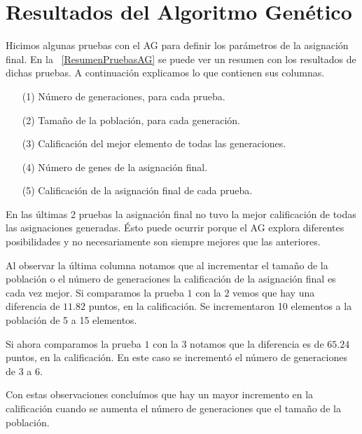 \section{Resultados del Algoritmo Genético}

Hicimos algunas pruebas con el AG para definir los parámetros de la asignación final. En la \tablename{~\ref{ResumenPruebasAG}} se puede ver un resumen con los resultados de dichas pruebas. A continuación explicamos lo que contienen sus columnas.

\begin{itemize}
\item[(1)] Número de generaciones, para cada prueba.

\item[(2)] Tamaño de la población, para cada generación.

\item[(3)] Calificación del mejor elemento de todas las generaciones.

\item[(4)] Número de genes de la asignación final.

\item[(5)] Calificación de la asignación final de cada prueba.
\end{itemize}

En las últimas 2 pruebas la asignación final no tuvo la mejor calificación de todas las asignaciones generadas. Ésto puede ocurrir porque el AG explora diferentes posibilidades y no necesariamente son siempre mejores que las anteriores.

Al observar la última columna notamos que al incrementar el tamaño de la población o el número de generaciones la calificación de la asignación final es cada vez mejor. Si comparamos la prueba $1$ con la $2$ vemos que hay una diferencia de $11.82$ puntos, en la calificación. Se incrementaron 10 elementos a la población de 5 a 15 elementos.

Si ahora comparamos la prueba $1$ con la $3$ notamos que la diferencia es de $65.24$ puntos, en la calificación. En este caso se incrementó el número de generaciones de 3 a 6.

Con estas observaciones concluímos que hay un mayor incremento en la calificación cuando se aumenta el número de generaciones que el tamaño de la población.

